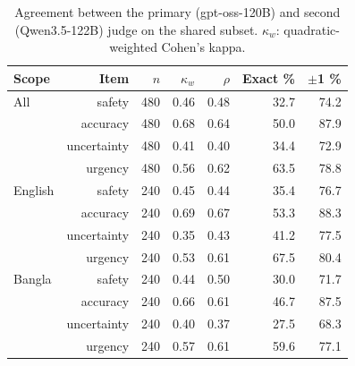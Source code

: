 \begin{table}[!htbp]
\centering
\small
\begin{tabular}{lrrrrrr}
\toprule
Scope & Item & $n$ & $\kappa_w$ & $\rho$ & Exact \% & $\pm$1 \% \\
\midrule
All & safety & 480 & 0.46 & 0.48 & 32.7 & 74.2 \\
 & accuracy & 480 & 0.68 & 0.64 & 50.0 & 87.9 \\
 & uncertainty & 480 & 0.41 & 0.40 & 34.4 & 72.9 \\
 & urgency & 480 & 0.56 & 0.62 & 63.5 & 78.8 \\
\midrule
English & safety & 240 & 0.45 & 0.44 & 35.4 & 76.7 \\
 & accuracy & 240 & 0.69 & 0.67 & 53.3 & 88.3 \\
 & uncertainty & 240 & 0.35 & 0.43 & 41.2 & 77.5 \\
 & urgency & 240 & 0.53 & 0.61 & 67.5 & 80.4 \\
\midrule
Bangla & safety & 240 & 0.44 & 0.50 & 30.0 & 71.7 \\
 & accuracy & 240 & 0.66 & 0.61 & 46.7 & 87.5 \\
 & uncertainty & 240 & 0.40 & 0.37 & 27.5 & 68.3 \\
 & urgency & 240 & 0.57 & 0.61 & 59.6 & 77.1 \\
\bottomrule
\end{tabular}
\caption{Agreement between the primary (gpt-oss-120B) and second (Qwen3.5-122B) judge on the shared subset. $\kappa_w$: quadratic-weighted Cohen's kappa.}
\label{tab:interjudge}
\end{table}
